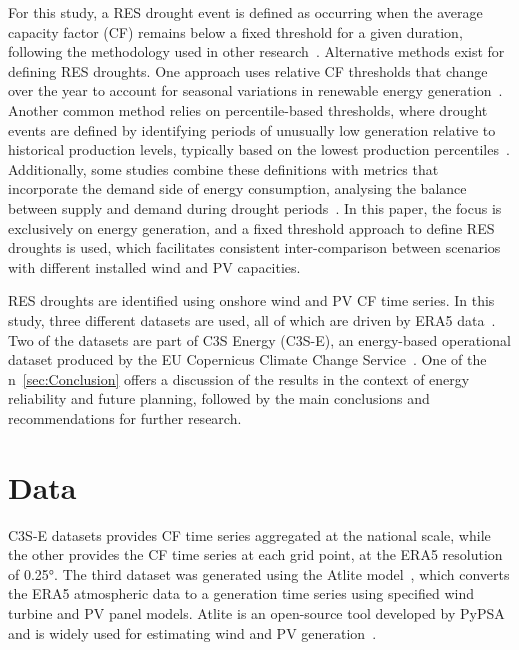 \documentclass[preprint, 12pt]{elsarticle}
\begin{document}
For this study, a RES drought event is defined as occurring when the average capacity factor (CF) remains below a fixed threshold for a given duration, following the methodology used in other research~\citep{kaspar2019drought, ohba2022drought, mockert2023drought, mayer2023drought}. Alternative methods exist for defining RES droughts. One approach uses relative CF thresholds that change over the year to account for seasonal variations in renewable energy generation~\citep{raynaud2018drought, rinaldi2021drought, gangopadhyay2022drought, allen2023drought, kapica2024drought}. Another common method relies on percentile-based thresholds, where drought events are defined by identifying periods of unusually low generation relative to historical production levels, typically based on the lowest production percentiles~\citep{allen2023drought, bracken2024drought}. Additionally, some studies combine these definitions with metrics that incorporate the demand side of energy consumption, analysing the balance between supply and demand during drought periods~\citep{raynaud2018drought, rinaldi2021drought, allen2023drought, bracken2024drought}. In this paper, the focus is exclusively on energy generation, and a fixed threshold approach to define RES droughts is used, which facilitates consistent inter-comparison between scenarios with different installed wind and PV capacities.

RES droughts are identified using onshore wind and PV CF time series. In this study, three different datasets are used, all of which are driven by ERA5 data~\citep{hersbach2020era5}. Two of the datasets are part of C3S Energy (C3S-E), an energy-based operational dataset produced by the EU Copernicus Climate Change Service~\citep{dubus2023energy, cds2023energy}. One of the n~\ref{sec:Conclusion} offers a discussion of the results in the context of energy reliability and future planning, followed by the main conclusions and recommendations for further research.

\section{Data}
\label{sec:Data}C3S-E datasets provides CF time series aggregated at the national scale, while the other provides the CF time series at each grid point, at the ERA5 resolution of 0.25°. The third dataset was generated using the Atlite model~\citep{hofman2021atlite}, which converts the ERA5 atmospheric data to a generation time series using specified wind turbine and PV panel models. Atlite is an open-source tool developed by PyPSA~\citep{hofman2021atlite} and is widely used for estimating wind and PV generation~\citep{mockert2023drought, li2023atlite, parzen2023atlite, ali2023comparative}.
\end{document}
